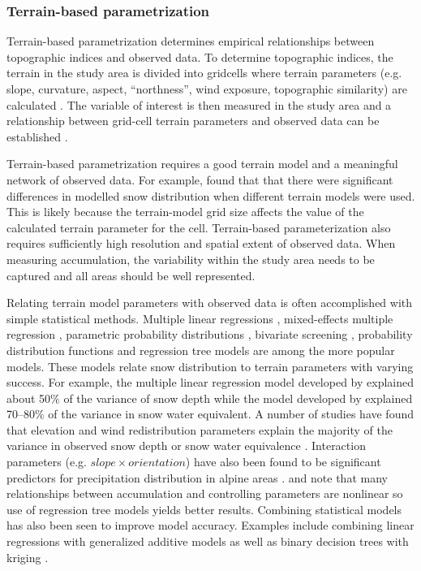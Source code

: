 \documentclass{sfuthesis}
\begin{document}
\subsubsection{Terrain-based parametrization}
Terrain-based parametrization determines empirical relationships between topographic indices and observed data. To determine topographic indices, the terrain in the study area is divided into gridcells where terrain parameters (e.g. slope, curvature, aspect, ``northness'', wind exposure, topographic similarity) are calculated \citep{Anderson2014,McGrath2015}. The variable of interest is then measured in the study area and a relationship between grid-cell terrain parameters and observed data can be established \citep[e.g.][]{Bloschl1991, Liston1998, Anderton2004,McGrath2015}. 

Terrain-based parametrization requires a good terrain model and a meaningful network of observed data. For example, \cite{Molotch2005} found that that there were significant differences in modelled snow distribution when different terrain models were used. This is likely because the terrain-model grid size affects the value of the calculated terrain parameter for the cell. Terrain-based parameterization also requires sufficiently high resolution and spatial extent of observed data. When measuring accumulation, the variability within the study area needs to be captured and all areas should be well represented. 

Relating terrain model parameters with observed data is often accomplished with simple statistical methods. Multiple linear regressions \citep{Marchand2005, Sold2013, McGrath2015}, mixed-effects multiple regression \citep{Kasurak2011}, parametric probability distributions \citep{Clark2011}, bivariate screening \citep{Anderton2004}, probability distribution functions \citep{Kerr2013} and regression tree models \citep{Elder1998, Winstral2002, Molotch2005, Revuelto2014, Wetlaufer2016} are among the more popular models. These models relate snow distribution to terrain parameters with varying success. For example, the multiple linear regression model developed by \cite{Sold2013} explained about 50$\%$ of the variance of snow depth while the model developed by \cite{Anderton2004} explained 70--80$\%$ of the variance in snow water equivalent. A number of studies have found that elevation and wind redistribution parameters explain the majority of the variance in observed snow depth or snow water equivalence \citep[e.g.][]{Erickson2005, Trujillo2009,Schirmer2011, Grunewald2014, McGrath2015}. Interaction parameters (e.g. $slope \times orientation$) have also been found to be significant predictors for precipitation distribution in alpine areas \citep{Basist1994}. \cite{Erxleben2002} and \cite{Molotch2005} note that many relationships between accumulation and controlling parameters are nonlinear so use of regression tree models yields better results. Combining statistical models has also been seen to improve model accuracy. Examples include combining linear regressions with generalized additive models \citep{Lopez2006} as well as binary decision trees with kriging \citep{Balk2000}. 
\end{document}
